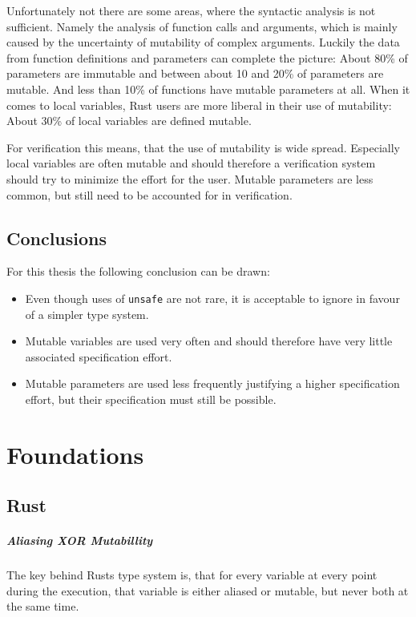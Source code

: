 \documentclass{book}
\newcommand{\code}[1]{\texttt{#1}}
\theoremstyle{definition}
\begin{document}
Unfortunately not there are some areas, where the syntactic analysis is not sufficient. Namely the analysis of function calls and arguments, which is mainly caused by the uncertainty of mutability of complex arguments.
Luckily the data from function definitions and parameters can complete the picture: About 80\% of parameters are immutable and between about 10 and 20\% of parameters are mutable. And less than 10\% of functions have mutable parameters at all.
When it comes to local variables, Rust users are more liberal in their use of mutability:
About 30\% of local variables are defined mutable.

For verification this means, that the use of mutability is wide spread. Especially local variables are often mutable and should therefore a verification system should try to minimize the effort for the user. Mutable parameters are less common, but still need to be accounted for in verification.

\section{Conclusions}

For this thesis the following conclusion can be drawn:

\begin{itemize}
  \item Even though uses of \code{unsafe} are not rare, it is acceptable to ignore in favour of a simpler type system.
  \item Mutable variables are used very often and should therefore have very little associated specification effort.
  \item Mutable parameters are used less frequently justifying a higher specification effort, but their specification must still be possible.
\end{itemize}

\chapter{Foundations}

\section{Rust}


\paragraph{Aliasing XOR Mutabillity} The key behind Rusts type system is, that for every variable at every point during the execution, that variable is either aliased or mutable, but never both at the same time.
\end{document}
